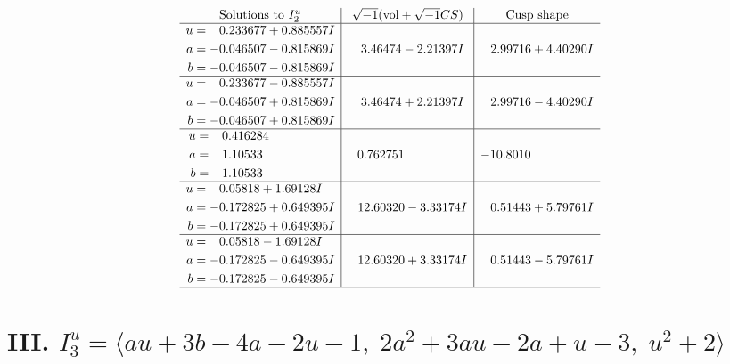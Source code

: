 \documentclass[1p]{elsarticle_modified}
\theoremstyle{definition}
\newcommand{\I}{\sqrt{-1}}
\begin{document}
$$\begin{array}{c|c|c}  
\text{Solutions to }I^u_{2}& \I (\text{vol} + \sqrt{-1}CS) & \text{Cusp shape}\\
 \hline 
\begin{aligned}
u &= \phantom{-}0.233677 + 0.885557 I \\
a &= -0.046507 - 0.815869 I \\
b &= -0.046507 - 0.815869 I\end{aligned}
 & \phantom{-}3.46474 - 2.21397 I & \phantom{-}2.99716 + 4.40290 I \\ \hline\begin{aligned}
u &= \phantom{-}0.233677 - 0.885557 I \\
a &= -0.046507 + 0.815869 I \\
b &= -0.046507 + 0.815869 I\end{aligned}
 & \phantom{-}3.46474 + 2.21397 I & \phantom{-}2.99716 - 4.40290 I \\ \hline\begin{aligned}
u &= \phantom{-}0.416284\phantom{ +0.000000I} \\
a &= \phantom{-}1.10533\phantom{ +0.000000I} \\
b &= \phantom{-}1.10533\phantom{ +0.000000I}\end{aligned}
 & \phantom{-}0.762751\phantom{ +0.000000I} & -10.8010\phantom{ +0.000000I} \\ \hline\begin{aligned}
u &= \phantom{-}0.05818 + 1.69128 I \\
a &= -0.172825 + 0.649395 I \\
b &= -0.172825 + 0.649395 I\end{aligned}
 & \phantom{-}12.60320 - 3.33174 I & \phantom{-}0.51443 + 5.79761 I \\ \hline\begin{aligned}
u &= \phantom{-}0.05818 - 1.69128 I \\
a &= -0.172825 - 0.649395 I \\
b &= -0.172825 - 0.649395 I\end{aligned}
 & \phantom{-}12.60320 + 3.33174 I & \phantom{-}0.51443 - 5.79761 I\\
 \hline 
 \end{array}$$\newpage\newpage\renewcommand{\arraystretch}{1}
\centering \section*{III. $I^u_{3}= \langle a u+3 b-4 a-2 u-1,\;2 a^2+3 a u-2 a+u-3,\;u^2+2 \rangle$}
\end{document}

